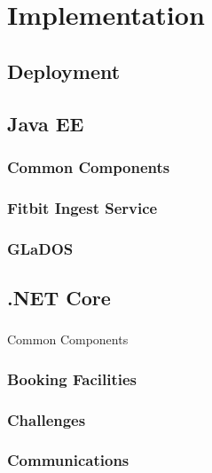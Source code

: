 \chapter{Implementation}

\section{Deployment}
    

\section{Java EE}
    \subsection{Common Components}
    	

    \subsection{Fitbit Ingest Service}
        

    \subsection{GLaDOS}
    	

\section{.NET Core}
    \subsection{}{Common Components}
    	
    \subsection{Booking Facilities}
    	
    \subsection{Challenges}
    	
    \subsection{Communications}
    	
